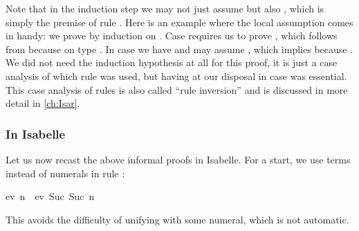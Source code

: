 \begin{isabellebody}
\begin{isamarkuptext}
Note that in the induction step we may not just assume  but also
\mbox{}, which is simply the premise of rule .  Here is an example where the local assumption  comes in
handy: we prove  by induction on .
Case  requires us to prove , which follows
from  because  on type . In
case  we have \mbox{} and may assume
, which implies  because . We did not need the induction hypothesis at all for this proof,
it is just a case analysis of which rule was used, but having  at our disposal in case  was essential.
This case analysis of rules is also called ``rule inversion''
and is discussed in more detail in \autoref{ch:Isar}.

\subsubsection{In Isabelle}

Let us now recast the above informal proofs in Isabelle. For a start,
we use  terms instead of numerals in rule :
\begin{isabelle}%
ev\ n\ {}\ ev\ {}Suc\ {}Suc\ n{}{}%
\end{isabelle}
This avoids the difficulty of unifying  with some numeral,
which is not automatic.


\end{isamarkuptext}
\end{isabellebody}
